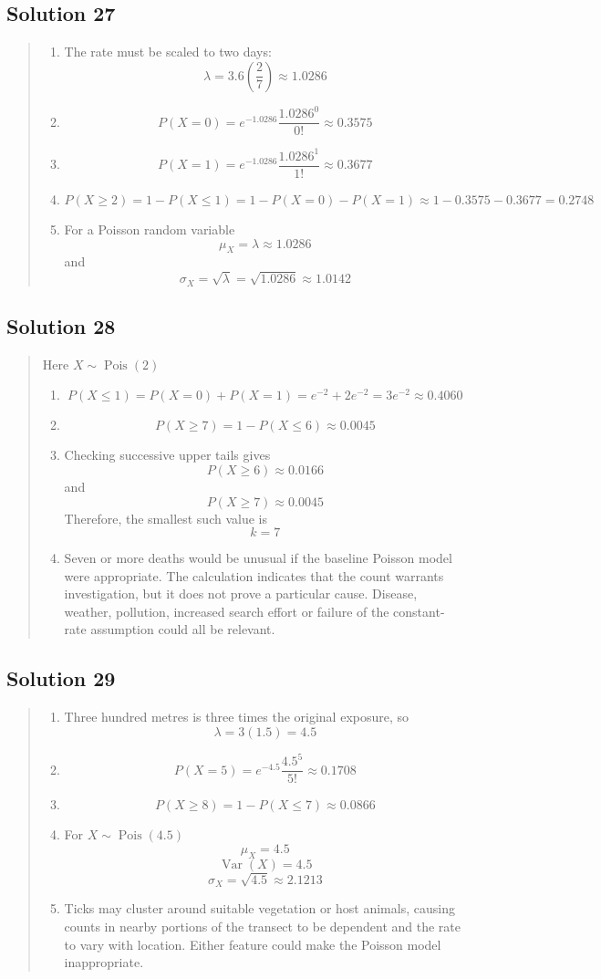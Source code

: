 \documentclass[10pt,letterpaper]{article}
\newcommand{\solutionheading}[1]{%
  \subsection*{Solution #1}
}
\newenvironment{answer}{%
  \begin{quote}\small\color{black}
}{%
  \end{quote}
}
\begin{document}
\solutionheading{27}
\begin{answer}
\begin{enumerate}
	\item The rate must be scaled to two days:
	$$\lambda=3.6\left(\frac{2}{7}\right)\approx1.0286$$
  	\item
	$$P(X=0)=e^{-1.0286}\frac{1.0286^0}{0!}\approx0.3575$$
  	\item
	$$P(X=1)=e^{-1.0286}\frac{1.0286^1}{1!}\approx0.3677$$
  	\item
	$$P(X\geq2)=1-P(X\leq1)=1-P(X=0)-P(X=1)\approx1-0.3575-0.3677=0.2748$$
  	\item For a Poisson random variable
	$$\mu_X=\lambda\approx1.0286$$
  	and
	$$\sigma_X=\sqrt{\lambda}=\sqrt{1.0286}\approx1.0142$$
\end{enumerate}
\end{answer}

\solutionheading{28}
\begin{answer}
Here $X\sim\operatorname{Pois}(2)$
\begin{enumerate}
	\item
	$$P(X\leq1)=P(X=0)+P(X=1)=e^{-2}+2e^{-2}=3e^{-2}\approx0.4060$$
	\item
	$$P(X\geq7)=1-P(X\leq6)\approx0.0045$$
	\item Checking successive upper tails gives
	$$P(X\geq6)\approx0.0166$$
  	and
	$$P(X\geq7)\approx0.0045$$
  	Therefore, the smallest such value is
	$$k=7$$
	\item Seven or more deaths would be unusual if the baseline Poisson model were appropriate. The calculation indicates that the count warrants investigation, but it does not prove a particular cause. Disease, weather, pollution, increased search effort or failure of the constant-rate assumption could all be relevant.
\end{enumerate}
\end{answer}

\solutionheading{29}
\begin{answer}
\begin{enumerate}
	\item Three hundred metres is three times the original exposure, so
	$$\lambda=3(1.5)=4.5$$
  	\item
	$$P(X=5)=e^{-4.5}\frac{4.5^5}{5!}\approx0.1708$$
  	\item
	$$P(X\geq8)=1-P(X\leq7)\approx0.0866$$
	\item For $X\sim\operatorname{Pois}(4.5)$
	$$\mu_X=4.5$$
	$$\operatorname{Var}(X)=4.5$$
	$$\sigma_X=\sqrt{4.5}\approx2.1213$$
	\item Ticks may cluster around suitable vegetation or host animals, causing counts in nearby portions of the transect to be dependent and the rate to vary with location. Either feature could make the Poisson model inappropriate.
\end{enumerate}
\end{answer}
\end{document}
